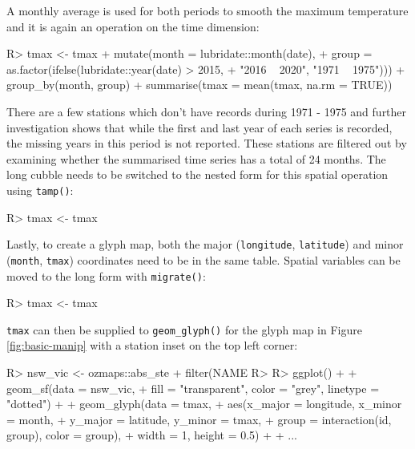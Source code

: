 \documentclass[
]{jss}
\begin{document}
A monthly average is used for both periods to smooth the maximum
temperature and it is again an operation on the time dimension:

\begin{CodeChunk}
\begin{CodeInput}
R> tmax <- tmax %
+   mutate(month = lubridate::month(date), 
+          group = as.factor(ifelse(lubridate::year(date) > 2015, 
+                                   "2016 ~ 2020", "1971 ~ 1975"))) %
+   group_by(month, group) %
+   summarise(tmax = mean(tmax, na.rm = TRUE))
\end{CodeInput}
\end{CodeChunk}

There are a few stations which don't have records during 1971 - 1975 and
further investigation shows that while the first and last year of each
series is recorded, the missing years in this period is not reported.
These stations are filtered out by examining whether the summarised time
series has a total of 24 months. The long cubble needs to be switched to
the nested form for this spatial operation using \texttt{tamp()}:

\begin{CodeChunk}
\begin{CodeInput}
R> tmax <- tmax %
\end{CodeInput}
\end{CodeChunk}

Lastly, to create a glyph map, both the major (\texttt{longitude},
\texttt{latitude}) and minor (\texttt{month}, \texttt{tmax}) coordinates
need to be in the same table. Spatial variables can be moved to the long
form with \texttt{migrate()}:

\begin{CodeChunk}
\begin{CodeInput}
R> tmax <- tmax %
\end{CodeInput}
\end{CodeChunk}

\texttt{tmax} can then be supplied to \texttt{geom\_glyph()} for the
glyph map in Figure \ref{fig:basic-manip} with a station inset on the
top left corner:

\begin{CodeChunk}
\begin{CodeInput}
R> nsw_vic <- ozmaps::abs_ste %
+   filter(NAME %
R> 
R> ggplot() + 
+   geom_sf(data = nsw_vic, 
+           fill = "transparent", color = "grey", linetype = "dotted") + 
+   geom_glyph(data = tmax, 
+              aes(x_major = longitude, x_minor = month, 
+                  y_major = latitude, y_minor = tmax,
+                  group = interaction(id, group), color = group),
+              width = 1, height = 0.5) +
+   ...
\end{CodeInput}
\end{CodeChunk}
\end{document}
